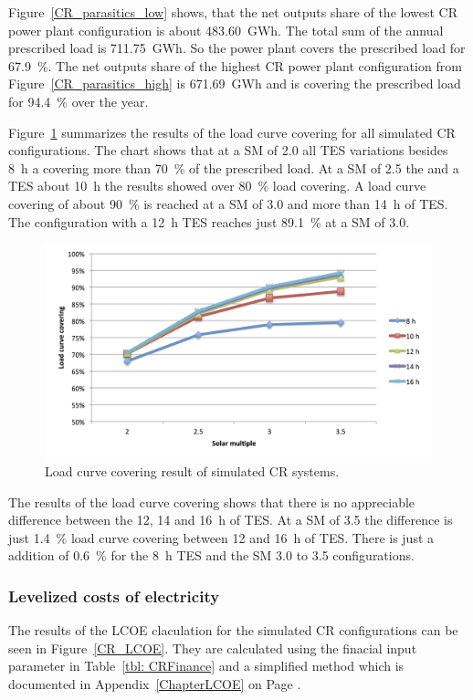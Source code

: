 Figure~\ref{CR_parasitics_low} shows, that the net outputs share of the lowest CR power plant configuration is about \SI{483.60}{GWh}.  The total sum of the annual prescribed load is \SI{711.75}{GWh}. So the power plant covers the prescribed load for 67.9~\%. The net outputs share of the highest CR power plant configuration from Figure~\ref{CR_parasitics_high} is \SI{671.69}{GWh} and is covering the prescribed load for 94.4~\% over the year.

Figure~\ref{CR_LCCF} summarizes the results of the load curve covering for all simulated CR configurations. The chart shows that at a SM of 2.0 all TES variations besides \SI{8}{h} a covering more than 70~\% of the prescribed load. At a SM of 2.5 the and a TES about \SI{10}{h} the results showed over 80~\% load covering. A load curve covering of about 90~\% is reached at a SM of 3.0 and more than \SI{14}{h} of TES. The configuration with a \SI{12}{h} TES reaches just 89.1~\% at a SM of 3.0. 

\begin{figure}[htbp]  
\centering
\includegraphics[width=1\linewidth]{FIG/CR_LCCF}
\caption[Load curve covering result of simulated CR systems.]{Load curve covering result of simulated CR systems.}\label{CR_LCCF}
\end{figure}
The results of the load curve covering shows that there is no appreciable difference between the 12, 14 and \SI{16}{h} of TES. At a SM of 3.5 the difference is just 1.4~\% load curve covering between 12 and \SI{16}{h} of TES. There is just a addition of 0.6~\% for the \SI{8}{h} TES and the SM 3.0 to 3.5 configurations. 
\subsubsection{Levelized costs of electricity}
The results of the LCOE claculation for the simulated CR configurations can be seen in Figure~\ref{CR_LCOE}. They are calculated using the finacial input parameter in Table~\ref{tbl: CRFinance} and a simplified method which is documented in Appendix~\ref{ChapterLCOE} on Page \pageref{ChapterLCOE}.

